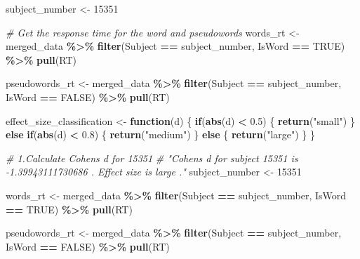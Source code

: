 \documentclass[
]{article}
\newenvironment{Shaded}{\begin{snugshade}}{\end{snugshade}}
\newcommand{\CommentTok}[1]{\textcolor[rgb]{0.56,0.35,0.01}{\textit{#1}}}
\newcommand{\ConstantTok}[1]{\textcolor[rgb]{0.56,0.35,0.01}{#1}}
\newcommand{\ControlFlowTok}[1]{\textcolor[rgb]{0.13,0.29,0.53}{\textbf{#1}}}
\newcommand{\DecValTok}[1]{\textcolor[rgb]{0.00,0.00,0.81}{#1}}
\newcommand{\FloatTok}[1]{\textcolor[rgb]{0.00,0.00,0.81}{#1}}
\newcommand{\FunctionTok}[1]{\textcolor[rgb]{0.13,0.29,0.53}{\textbf{#1}}}
\newcommand{\NormalTok}[1]{#1}
\newcommand{\OtherTok}[1]{\textcolor[rgb]{0.56,0.35,0.01}{#1}}
\newcommand{\SpecialCharTok}[1]{\textcolor[rgb]{0.81,0.36,0.00}{\textbf{#1}}}
\newcommand{\StringTok}[1]{\textcolor[rgb]{0.31,0.60,0.02}{#1}}
\begin{document}
\begin{Shaded}
\begin{Highlighting}[]
\NormalTok{subject\_number }\OtherTok{\textless{}{-}} \DecValTok{15351}

\CommentTok{\# Get the response time for the word and pseudowords}
\NormalTok{words\_rt }\OtherTok{\textless{}{-}}\NormalTok{ merged\_data }\SpecialCharTok{\%\textgreater{}\%}
  \FunctionTok{filter}\NormalTok{(Subject }\SpecialCharTok{==}\NormalTok{ subject\_number, IsWord }\SpecialCharTok{==} \ConstantTok{TRUE}\NormalTok{) }\SpecialCharTok{\%\textgreater{}\%}
  \FunctionTok{pull}\NormalTok{(RT)}

\NormalTok{pseudowords\_rt }\OtherTok{\textless{}{-}}\NormalTok{ merged\_data }\SpecialCharTok{\%\textgreater{}\%}
  \FunctionTok{filter}\NormalTok{(Subject }\SpecialCharTok{==}\NormalTok{ subject\_number, IsWord }\SpecialCharTok{==} \ConstantTok{FALSE}\NormalTok{) }\SpecialCharTok{\%\textgreater{}\%}
  \FunctionTok{pull}\NormalTok{(RT)}

\NormalTok{effect\_size\_classification }\OtherTok{\textless{}{-}} \ControlFlowTok{function}\NormalTok{(d) \{}
  \ControlFlowTok{if}\NormalTok{(}\FunctionTok{abs}\NormalTok{(d) }\SpecialCharTok{\textless{}} \FloatTok{0.5}\NormalTok{) \{}
    \FunctionTok{return}\NormalTok{(}\StringTok{"small"}\NormalTok{)}
\NormalTok{  \} }\ControlFlowTok{else} \ControlFlowTok{if}\NormalTok{(}\FunctionTok{abs}\NormalTok{(d) }\SpecialCharTok{\textless{}} \FloatTok{0.8}\NormalTok{) \{}
    \FunctionTok{return}\NormalTok{(}\StringTok{"medium"}\NormalTok{)}
\NormalTok{  \} }\ControlFlowTok{else}\NormalTok{ \{}
    \FunctionTok{return}\NormalTok{(}\StringTok{"large"}\NormalTok{)}
\NormalTok{  \}}
\NormalTok{\}}


\CommentTok{\# 1.Calculate Cohen\textquotesingle{}s d for 15351}
\CommentTok{\# "Cohen\textquotesingle{}s d for subject 15351 is {-}1.39943111730686 . Effect size is large ."}
\NormalTok{subject\_number }\OtherTok{\textless{}{-}} \DecValTok{15351}

\NormalTok{words\_rt }\OtherTok{\textless{}{-}}\NormalTok{ merged\_data }\SpecialCharTok{\%\textgreater{}\%}
  \FunctionTok{filter}\NormalTok{(Subject }\SpecialCharTok{==}\NormalTok{ subject\_number, IsWord }\SpecialCharTok{==} \ConstantTok{TRUE}\NormalTok{) }\SpecialCharTok{\%\textgreater{}\%}
  \FunctionTok{pull}\NormalTok{(RT)}

\NormalTok{pseudowords\_rt }\OtherTok{\textless{}{-}}\NormalTok{ merged\_data }\SpecialCharTok{\%\textgreater{}\%}
  \FunctionTok{filter}\NormalTok{(Subject }\SpecialCharTok{==}\NormalTok{ subject\_number, IsWord }\SpecialCharTok{==} \ConstantTok{FALSE}\NormalTok{) }\SpecialCharTok{\%\textgreater{}\%}
  \FunctionTok{pull}\NormalTok{(RT)}


\end{Highlighting}
\end{Shaded}
\end{document}
